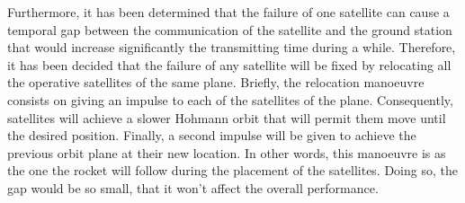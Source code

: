 Furthermore, it has been determined that the failure of one satellite can cause a temporal gap between the communication of the satellite and the ground station that would increase significantly the transmitting time during a while. Therefore, it has been decided that the failure of any satellite will be fixed by relocating all the operative satellites of the same plane. Briefly, the relocation manoeuvre consists on giving an impulse to each of the satellites of the plane. Consequently, satellites will achieve a slower Hohmann orbit that will permit them move until the desired position. Finally, a second impulse will be given to achieve the previous orbit plane at their new location. In other words, this manoeuvre is as the one the rocket will follow during the placement of the satellites. Doing so, the gap would be so small, that it won't affect the overall performance.
